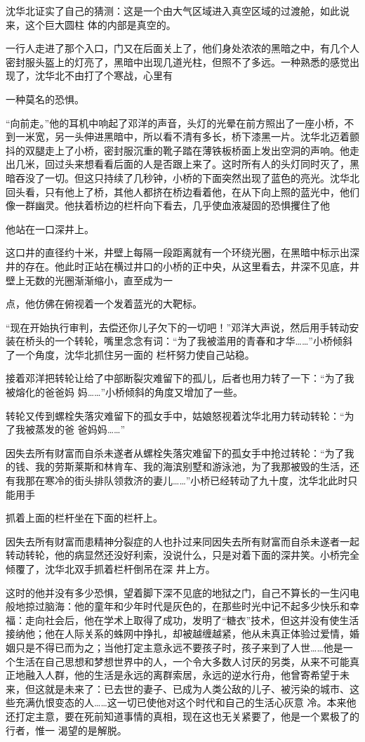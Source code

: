 \documentclass{article}
\begin{document}
沈华北证实了自己的猜测：这是一个由大气区域进入真空区域的过渡舱，如此说来，这个巨大圆柱
体的内部是真空的。 

一行人走进了那个入口，门又在后面关上了，他们身处浓浓的黑暗之中，有几个人密封服头盔上的灯亮了，黑暗中出现几道光柱，但照不了多远。一种熟悉的感觉出现了，沈华北不由打了个寒战，心里有
\newpage

一种莫名的恐惧。 

“向前走。”他的耳机中响起了邓洋的声音，头灯的光晕在前方照出了一座小桥，不到一米宽，另一头伸进黑暗中，所以看不清有多长，桥下漆黑一片。沈华北迈着颤抖的双腿走上了小桥，密封服沉重的靴子踏在薄铁板桥面上发出空洞的声响。他走出几米，回过头来想看看后面的人是否跟上来了。这时所有人的头灯同时灭了，黑暗吞没了一切。但这只持续了几秒钟，小桥的下面突然出现了蓝色的亮光。沈华北回头看，只有他上了桥，其他人都挤在桥边看着他，在从下向上照的蓝光中，他们像一群幽灵。他扶着桥边的栏杆向下看去，几乎使血液凝固的恐惧攫住了他


他站在一口深井上。 

这口井的直径约十米，井壁上每隔一段距离就有一个环绕光圈，在黑暗中标示出深井的存在。他此时正站在横过井口的小桥的正中央，从这里看去，井深不见底，井壁上无数的光圈渐渐缩小，直至成为一

\newpage
点，他仿佛在俯视着一个发着蓝光的大靶标。 

“现在开始执行审判，去偿还你儿子欠下的一切吧！”邓洋大声说，然后用手转动安装在桥头的一个转轮，嘴里念念有词：“为了我被滥用的青春和才华……”小桥倾斜了一个角度，沈华北抓住另一面的
栏杆努力使自己站稳。 

接着邓洋把转轮让给了中部断裂灾难留下的孤儿，后者也用力转了一下：“为了我被熔化的爸爸妈
妈……”小桥倾斜的角度又增加了一些。 

转轮又传到螺栓失落灾难留下的孤女手中，姑娘怒视着沈华北用力转动转轮：“为了我被蒸发的爸
爸妈妈……” 

因失去所有财富而自杀未遂者从螺栓失落灾难留下的孤女手中抢过转轮：“为了我的钱、我的劳斯莱斯和林肯车、我的海滨别墅和游泳池，为了我那被毁的生活，还有我那在寒冷的街头排队领救济的妻儿……”小桥已经转动了九十度，沈华北此时只能用手

\newpage
抓着上面的栏杆坐在下面的栏杆上。 

因失去所有财富而患精神分裂症的人也扑过来同因失去所有财富而自杀未遂者一起转动转轮，他的病显然还没好利索，没说什么，只是对着下面的深井笑。小桥完全倾覆了，沈华北双手抓着栏杆倒吊在深
井上方。 

这时的他并没有多少恐惧，望着脚下深不见底的地狱之门，自己不算长的一生闪电般地掠过脑海：他的童年和少年时代是灰色的，在那些时光中记不起多少快乐和幸福：走向社会后，他在学术上取得了成功，发明了“糖衣”技术，但这并没有使生活接纳他；他在人际关系的蛛网中挣扎，却被越缠越紧，他从未真正体验过爱情，婚姻只是不得已而为之；当他打定主意永远不要孩子时，孩子来到了人世……他是一个生活在自己思想和梦想世界中的人，一个令大多数人讨厌的另类，从来不可能真正地融入人群，他的生活是永远的离群索居，永远的逆水行舟，他曾寄希望于未来，但这就是未来了：已去世的妻子、已成为人类公敌的儿子、被污染的城市、这些充满仇恨变态的人……这一切已使他对这个时代和自己的生活心灰意
\newpage
冷。本来他还打定主意，要在死前知道事情的真相，现在这也无关紧要了，他是一个累极了的行者，惟一
渴望的是解脱。 
\end{document}

